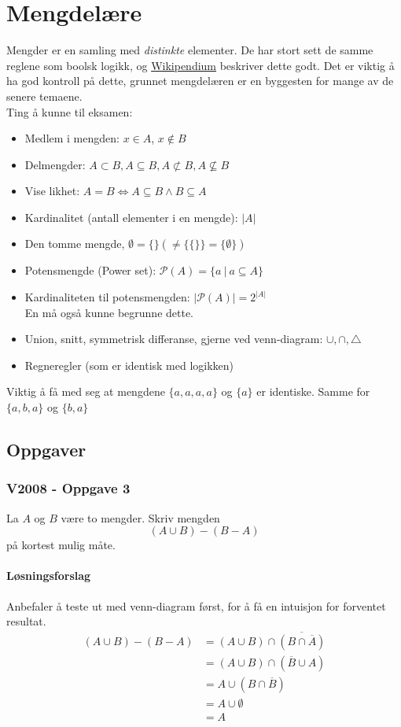 \section{Mengdelære}

Mengder er en samling med \textit{distinkte} elementer. De har stort sett de samme reglene
som boolsk logikk, og \href{https://www.wikipendium.no/MA0301_Elementary_Discrete_Mathematics#sets}{Wikipendium} beskriver dette godt.
Det er viktig å ha god kontroll på dette, grunnet mengdelæren er en byggesten for mange av de senere temaene.\\
Ting å kunne til eksamen:
\begin{itemize}
    \item Medlem i mengden: \(x\in A\), \(x\not\in B\)
    \item Delmengder: \(A \subset B, A\subseteq B, A\not\subset B, A \not\subseteq B\)
    \item Vise likhet: \(A=B \Leftrightarrow A\subseteq B \land B \subseteq A\)
    \item Kardinalitet (antall elementer i en mengde): \(|A|\)
    \item Den tomme mengde, \(\emptyset = \{\} \left(\neq \{\{\}\} = \{\emptyset\}\right)\)
    \item Potensmengde (Power set): \(\mathcal{P}(A) = \{a ~|~ a \subseteq A\}\)
    \item Kardinaliteten til potensmengden: \(|\mathcal{P}(A)| = 2^{|A|}\)\\
    En må også kunne begrunne dette.
    \item Union, snitt, symmetrisk differanse, gjerne ved venn-diagram: \(\cup, \cap, \triangle\)
    \item Regneregler (som er identisk med logikken)
\end{itemize}

\noindent Viktig å få med seg at mengdene \(\{a, a, a, a\}\) og \(\{a\}\) er identiske. Samme for \(\{a, b, a\}\) og \(\{b, a\}\)

\subsection{Oppgaver}

\subsubsection{V2008 - Oppgave 3}
La $A$ og $B$ være to mengder. Skriv mengden
\[
(A\cup B)-(B-A)    
\]
på kortest mulig måte.

\paragraph*{Løsningsforslag}
Anbefaler å teste ut med venn-diagram først, for å få en intuisjon for forventet resultat.
\begin{align*}
    (A\cup B)-(B-A) &= (A\cup B)\cap \overline{(B\cap\overline{A})}\\
    &= (A\cup B)\cap (\overline{B}\cup A)\\
    &= A\cup (B\cap \overline{B})\\
    &= A \cup \emptyset\\
    &= A
\end{align*}

